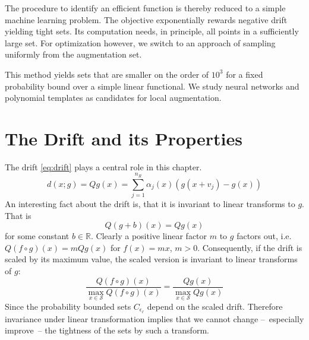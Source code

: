 The procedure to identify an efficient function is thereby reduced to a simple machine learning problem.
The objective exponentially rewards negative drift yielding tight sets.
Its computation needs, in principle, all points in a sufficiently large set.
For optimization however, we switch to an approach of sampling uniformly from the augmentation set.

This method yields sets that are smaller on the order of $10^3$ for a fixed probability bound over a simple linear functional.
We study neural networks and polynomial templates as candidates for local augmentation.

\section{The Drift and its Properties}
The drift \eqref{eq:drift} plays a central role in this chapter.
\begin{equation}
	d(x; g) = Qg(x) = \sum_{j=1}^{n_R} \alpha_j(x) (g(x+v_j) -  g(x))
\end{equation}
An interesting fact about the drift is, that it is invariant to linear transforms to $g$.
That is
\begin{equation}
	Q(g + b)(x)
	=Qg(x)
\end{equation}
for some constant $b\in\mathbb{R}$.
Clearly a positive linear factor $m$ to $g$ factors out, i.e.\ $Q(f\circ g)(x)=mQg(x)$ for $f(x) = mx$, $m>0$.
Consequently, if the drift is scaled by its maximum value, the scaled version is invariant to linear
transforms of $g$:
\begin{equation}
	\frac{Q(f\circ g)(x)}{\max_{x\in\mathcal{S}}Q(f \circ g)(x)}
	=
	\frac{Qg(x)}{\max_{x\in\mathcal{S}}Qg(x)}
\end{equation}
Since the probability bounded sets $C_{\epsilon_{\ell}}$ depend on the scaled drift.
Therefore invariance under linear transformation implies that we cannot change --~especially improve~-- the tightness of the sets by such a transform.

